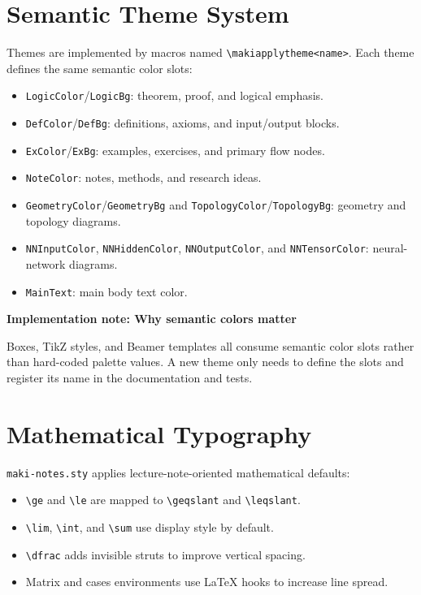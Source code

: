 \documentclass[a4paper,11pt]{ltxdoc}
\newcommand{\mfile}[1]{\texttt{#1}}
\newcommand{\mcmd}[1]{\texttt{\textbackslash#1}}
\newcommand{\mkey}[1]{\texttt{#1}}
\newenvironment{implementation}[1]
  {\par\medskip\noindent\textbf{\color{MakiBlue}Implementation note: #1}\par\smallskip}
  {\par\medskip}
\begin{document}
\section{Semantic Theme System}

Themes are implemented by macros named \mcmd{makiapplytheme<name>}. Each theme
defines the same semantic color slots:

\begin{itemize}
\item \mkey{LogicColor}/\mkey{LogicBg}: theorem, proof, and logical emphasis.
\item \mkey{DefColor}/\mkey{DefBg}: definitions, axioms, and input/output blocks.
\item \mkey{ExColor}/\mkey{ExBg}: examples, exercises, and primary flow nodes.
\item \mkey{NoteColor}: notes, methods, and research ideas.
\item \mkey{GeometryColor}/\mkey{GeometryBg} and \mkey{TopologyColor}/\mkey{TopologyBg}: geometry and topology diagrams.
\item \mkey{NNInputColor}, \mkey{NNHiddenColor}, \mkey{NNOutputColor}, and \mkey{NNTensorColor}: neural-network diagrams.
\item \mkey{MainText}: main body text color.
\end{itemize}

\begin{implementation}{Why semantic colors matter}
Boxes, TikZ styles, and Beamer templates all consume semantic color slots rather
than hard-coded palette values. A new theme only needs to define the slots and
register its name in the documentation and tests.
\end{implementation}

\section{Mathematical Typography}

\mfile{maki-notes.sty} applies lecture-note-oriented mathematical defaults:

\begin{itemize}
\item \mcmd{ge} and \mcmd{le} are mapped to \mcmd{geqslant} and \mcmd{leqslant}.
\item \mcmd{lim}, \mcmd{int}, and \mcmd{sum} use display style by default.
\item \mcmd{dfrac} adds invisible struts to improve vertical spacing.
\item Matrix and cases environments use LaTeX hooks to increase line spread.
\end{itemize}
\end{document}
